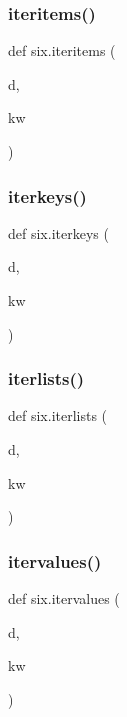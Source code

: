 \subsubsection{\texorpdfstring{iteritems()}{iteritems()}}
{\footnotesize\ttfamily def six.\+iteritems (\begin{DoxyParamCaption}\item[{}]{d,  }\item[{}]{kw }\end{DoxyParamCaption})}

\mbox{\label{namespacesix_a899a929d0fb30d96272a37df6709f0b0}} 
\subsubsection{\texorpdfstring{iterkeys()}{iterkeys()}}
{\footnotesize\ttfamily def six.\+iterkeys (\begin{DoxyParamCaption}\item[{}]{d,  }\item[{}]{kw }\end{DoxyParamCaption})}

\mbox{\label{namespacesix_ac8538bbb01331110a586f0ace3ee9b74}} 
\subsubsection{\texorpdfstring{iterlists()}{iterlists()}}
{\footnotesize\ttfamily def six.\+iterlists (\begin{DoxyParamCaption}\item[{}]{d,  }\item[{}]{kw }\end{DoxyParamCaption})}

\mbox{\label{namespacesix_a34ce02289f1999494da2b3274b465796}} 
\subsubsection{\texorpdfstring{itervalues()}{itervalues()}}
{\footnotesize\ttfamily def six.\+itervalues (\begin{DoxyParamCaption}\item[{}]{d,  }\item[{}]{kw }\end{DoxyParamCaption})}

